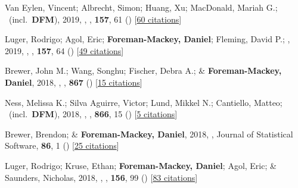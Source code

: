 \item[{\color{numcolor}\scriptsize42}] Van Eylen, Vincent; Albrecht, Simon; Huang, Xu; MacDonald, Mariah G.; \etal\ (incl.\ \textbf{DFM}), 2019, , \aj, \textbf{157}, 61 () [\href{https://ui.adsabs.harvard.edu/abs/2019AJ....157...61V}{60 citations}]

\item[{\color{numcolor}\scriptsize41}] Luger, Rodrigo; Agol, Eric; \textbf{Foreman-Mackey, Daniel}; Fleming, David P.; \etal, 2019, , \aj, \textbf{157}, 64 () [\href{https://ui.adsabs.harvard.edu/abs/2019AJ....157...64L}{49 citations}]

\item[{\color{numcolor}\scriptsize40}] Brewer, John M.; Wang, Songhu; Fischer, Debra A.; \& \textbf{Foreman-Mackey, Daniel}, 2018, , \apj, \textbf{867} () [\href{https://ui.adsabs.harvard.edu/abs/2018ApJ...867L...3B}{15 citations}]

\item[{\color{numcolor}\scriptsize39}] Ness, Melissa K.; Silva Aguirre, Victor; Lund, Mikkel N.; Cantiello, Matteo; \etal\ (incl.\ \textbf{DFM}), 2018, , \apj, \textbf{866}, 15 () [\href{https://ui.adsabs.harvard.edu/abs/2018ApJ...866...15N}{5 citations}]

\item[{\color{numcolor}\scriptsize38}] Brewer, Brendon; \& \textbf{Foreman-Mackey, Daniel}, 2018, , Journal of Statistical Software, \textbf{86}, 1 () [\href{https://scholar.google.com/scholar?cites=789224875040810871}{25 citations}]

\item[{\color{numcolor}\scriptsize37}] Luger, Rodrigo; Kruse, Ethan; \textbf{Foreman-Mackey, Daniel}; Agol, Eric; \& Saunders, Nicholas, 2018, , \aj, \textbf{156}, 99 () [\href{https://ui.adsabs.harvard.edu/abs/2018AJ....156...99L}{83 citations}]

